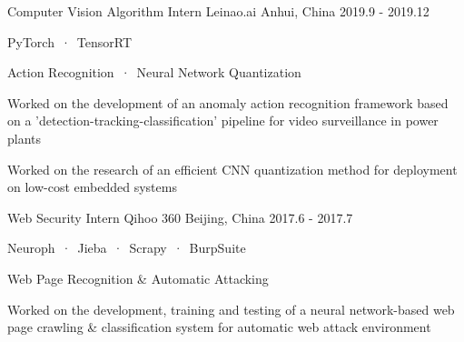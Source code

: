 

\begin{cventries}
  \cventrywork
    {Computer Vision Algorithm Intern} %
    {Leinao.ai} %
    {Anhui, China} %
    {2019.9 - 2019.12} %
    {
      \begin{cvitems} %
        \item {PyTorch\ ·\ TensorRT}
        \item {Action Recognition\ ·\ Neural Network Quantization}
        \item {Worked on the development of an anomaly action recognition framework based on a 'detection-tracking-classification' pipeline for video surveillance in power plants}
        \item {Worked on the research of an efficient CNN quantization method for deployment on low-cost embedded systems}
      \end{cvitems}
    }
    
  \cventrywork
    {Web Security Intern} %
    {Qihoo 360} %
    {Beijing, China} %
    {2017.6 - 2017.7} %
    {
      \begin{cvitems} %
        \item {Neuroph\ ·\ Jieba\ ·\ Scrapy\ ·\ BurpSuite}
        \item {Web Page Recognition \& Automatic Attacking}
        \item {Worked on the development, training and testing of a neural network-based web page crawling \& classification system for automatic web attack environment}
      \end{cvitems}
    }

  

\end{cventries}
